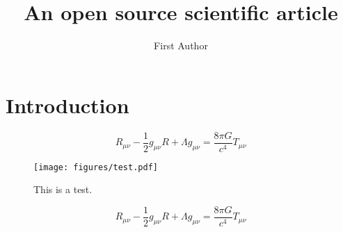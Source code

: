 \documentclass[twocolumn]{aastex631}
\begin{document}
\title{An open source scientific article}

\author[0000-0000-0000-0000]{First Author}

\begin{abstract}
    \blindtext
\end{abstract}

\section{Introduction}
\[
R_{\mu\nu}-\frac{1}{2}g_{\mu\nu}R+\Lambda g_{\mu\nu} = \frac{8\pi G}{c^4}T_{\mu\nu}
\]

\begin{figure}
    \begin{centering}
        \texttt{[image: figures/test.pdf]}
        \caption{This is a test.}
        \label{fig:test}
    \end{centering}
\end{figure}

\Blindtext[4]

\[
R_{\mu\nu}-\frac{1}{2}g_{\mu\nu}R+\Lambda g_{\mu\nu} = \frac{8\pi G}{c^4}T_{\mu\nu}
\]
\end{document}
